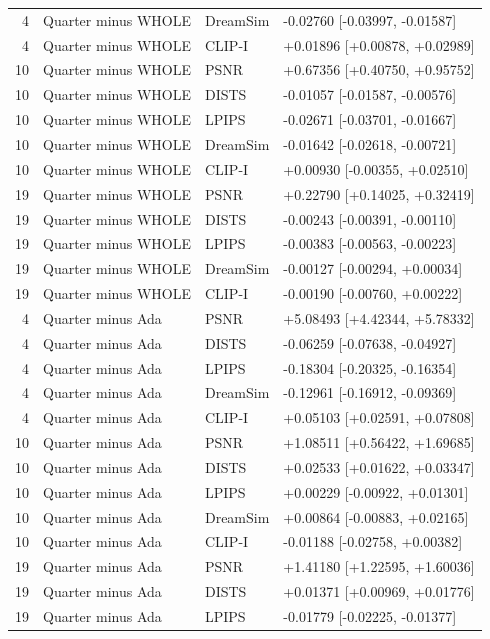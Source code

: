 \documentclass[10pt,letterpaper]{article}
\begin{document}
\begin{longtable}{@{}rlll@{}}
4 & Quarter minus WHOLE & DreamSim & -0.02760 [-0.03997, -0.01587]\\
4 & Quarter minus WHOLE & CLIP-I & +0.01896 [+0.00878, +0.02989]\\
10 & Quarter minus WHOLE & PSNR & +0.67356 [+0.40750, +0.95752]\\
10 & Quarter minus WHOLE & DISTS & -0.01057 [-0.01587, -0.00576]\\
10 & Quarter minus WHOLE & LPIPS & -0.02671 [-0.03701, -0.01667]\\
10 & Quarter minus WHOLE & DreamSim & -0.01642 [-0.02618, -0.00721]\\
10 & Quarter minus WHOLE & CLIP-I & +0.00930 [-0.00355, +0.02510]\\
19 & Quarter minus WHOLE & PSNR & +0.22790 [+0.14025, +0.32419]\\
19 & Quarter minus WHOLE & DISTS & -0.00243 [-0.00391, -0.00110]\\
19 & Quarter minus WHOLE & LPIPS & -0.00383 [-0.00563, -0.00223]\\
19 & Quarter minus WHOLE & DreamSim & -0.00127 [-0.00294, +0.00034]\\
19 & Quarter minus WHOLE & CLIP-I & -0.00190 [-0.00760, +0.00222]\\
4 & Quarter minus Ada & PSNR & +5.08493 [+4.42344, +5.78332]\\
4 & Quarter minus Ada & DISTS & -0.06259 [-0.07638, -0.04927]\\
4 & Quarter minus Ada & LPIPS & -0.18304 [-0.20325, -0.16354]\\
4 & Quarter minus Ada & DreamSim & -0.12961 [-0.16912, -0.09369]\\
4 & Quarter minus Ada & CLIP-I & +0.05103 [+0.02591, +0.07808]\\
10 & Quarter minus Ada & PSNR & +1.08511 [+0.56422, +1.69685]\\
10 & Quarter minus Ada & DISTS & +0.02533 [+0.01622, +0.03347]\\
10 & Quarter minus Ada & LPIPS & +0.00229 [-0.00922, +0.01301]\\
10 & Quarter minus Ada & DreamSim & +0.00864 [-0.00883, +0.02165]\\
10 & Quarter minus Ada & CLIP-I & -0.01188 [-0.02758, +0.00382]\\
19 & Quarter minus Ada & PSNR & +1.41180 [+1.22595, +1.60036]\\
19 & Quarter minus Ada & DISTS & +0.01371 [+0.00969, +0.01776]\\
19 & Quarter minus Ada & LPIPS & -0.01779 [-0.02225, -0.01377]\\

\end{longtable}
\end{document}
